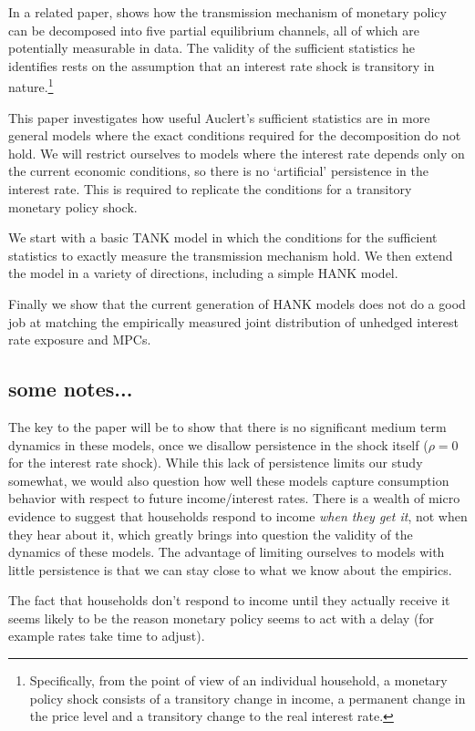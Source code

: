 \documentclass[titlepage]{\econtex}\newcommand{\texname}{ConsumptionHeterogeneity}
\begin{document}
In a related paper, \cite{auclert_monetary_2017} shows how the transmission mechanism of monetary policy can be decomposed into five partial equilibrium channels, all of which are potentially measurable in data. The validity of the sufficient statistics he identifies rests on the assumption that an interest rate shock is transitory in nature.\footnote{Specifically, from the point of view of an individual household, a monetary policy shock consists of a transitory change in income, a permanent change in the price level and a transitory change to the real interest rate.}

This paper investigates how useful Auclert's sufficient statistics are in more general models where the exact conditions required for the decomposition do not hold. We will restrict ourselves to models where the interest rate depends only on the current economic conditions, so there is no `artificial' persistence in the interest rate. This is required to replicate the conditions for a transitory monetary policy shock.

We start with a basic TANK model in which the conditions for the sufficient statistics to exactly measure the transmission mechanism hold. We then extend the model in a variety of directions, including a simple HANK model.

Finally we show that the current generation of HANK models does not do a good job at matching the empirically measured joint distribution of unhedged interest rate exposure and MPCs.

\subsection{some notes...}
The key to the paper will be to show that there is no significant medium term dynamics in these models, once we disallow persistence in the shock itself ($\rho = 0$ for the interest rate shock). While this lack of persistence limits our study somewhat, we would also question how well these models capture consumption behavior with respect to future income/interest rates. There is a wealth of micro evidence to suggest that households respond to income \textit{when they get it}, not when they hear about it, which greatly brings into question the validity of the dynamics of these models. The advantage of limiting ourselves to models with little persistence is that we can stay close to what we know about the empirics.

The fact that households don't respond to income until they actually receive it seems likely to be the reason monetary policy seems to act with a delay (for example rates take time to adjust).
\end{document}
